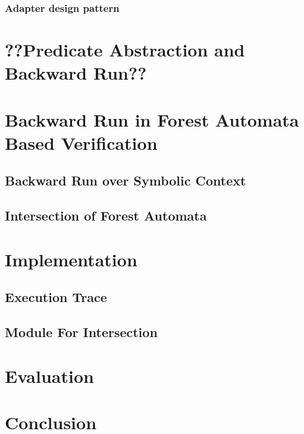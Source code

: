 \subsection{Adapter design pattern}

\chapter{??Predicate Abstraction and Backward Run??}
\label{ch:pred}

\chapter{Backward Run in Forest Automata Based Verification}
\label{ch:backward}

\section{Backward Run over Symbolic Context}

\section{Intersection of Forest Automata}

\chapter{Implementation}
\label{ch:impl}

\section{Execution Trace}
\section{Module For Intersection}

\chapter{Evaluation}
\label{ch:eval}

\chapter{Conclusion}
\label{ch:concl}
